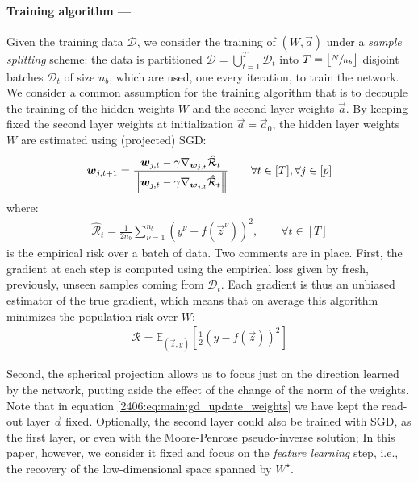 \paragraph{Training algorithm ---} Given the training data $\mathcal{D}$, we consider the training of $(W,\vec{a})$ under a \emph{sample splitting} scheme: the data is partitioned $\mathcal{D} = \bigcup_{t=1}^{T}\mathcal{D}_{t}$ into $T =  \left \lfloor \sfrac{N}{n_{b}} \right \rfloor$ disjoint batches $\mathcal{D}_{t}$ of size $n_{b}$, which are used, one every iteration, to train the network. We consider a common assumption for the training algorithm that is to decouple the training of the hidden weights $W$ and the second layer weights $\vec a$.
By keeping fixed the second layer weights at initialization $\vec a = \vec a_0$, the hidden layer weights $W$ are estimated using (projected) SGD: 
\begin{align}
    {\boldsymbol{w}}_{j,t+1} =  \frac{{\boldsymbol{w}}_{j,t} - \gamma \nabla_{{\boldsymbol{w}}_{j,t}}\hat{\mathcal{R}}_t}{\left\lVert {\boldsymbol{w}}_{j,t} - \gamma \nabla_{{\boldsymbol{w}}_{j,t}}\hat{\mathcal{R}}_t\right\rVert} \qquad \forall t \in [T],   \forall j \in [p]
    \label{2406:eq:main:gd_update_weights}
\end{align}
where:
\begin{align} \label{2406:eq:main:projected_sgd}
    \hat{\mathcal{R}}_t = \frac{1}{2n_{b}} \sum_{\nu = 1}^{n_b}(y^\nu-f(\vec z^\nu))^2, \qquad \forall t \in [T]
\end{align}
is the empirical risk over a batch of data. Two comments are in place. First, the gradient at each step is computed using the empirical loss given by fresh, previously, unseen samples coming from $\mathcal{D}_{t}$. Each gradient is thus an unbiased estimator of the true gradient, which means that on average this algorithm minimizes the population risk over $W$:
\begin{align}
\label{2406:eq:main:risk}
        \mathcal R = \mathbb{E}_{(\vec z,y)} \left[\frac12 (y-f(\vec z))^2\right]
\end{align}

Second, the spherical projection allows us to focus just on the direction learned by the network, putting aside the effect of the change of the norm of the weights. Note that in equation \eqref{2406:eq:main:gd_update_weights} we have kept the read-out layer $\vec{a}$ fixed. Optionally, the second layer could also be trained with SGD, as the first layer, or even with the Moore-Penrose pseudo-inverse solution; In this paper, however, we consider it fixed and focus on the \textit{feature learning} step, i.e., the recovery of the low-dimensional space spanned by $W^{\star}$. 


